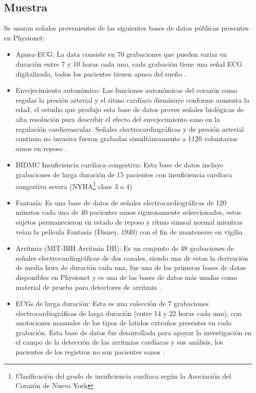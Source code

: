 \documentclass[12pt,letterpaper,oneside,openright]{book}
\begin{document}
\subsection{Muestra}
Se usaran señales provenientes de las siguientes bases de datos públicas presentes en Physionet: 
\begin{itemize}
	\item Apnea-ECG: La data consiste en 70 grabaciones que pueden variar en duración entre 7 y 10 horas cada uno, cada grabación tiene una señal ECG digitalizada, todos los pacientes tienen apnea del sueño \cite{apneaDB}. 
	\item Envejecimiento autonómico: Las funciones autonómicas del corazón como regular la presión arterial y el ritmo cardíaco disminuye conforme aumenta la edad, el estudio que produjo esta base de datos provee señales biológicas de alta resolución para describir el efecto del envejecimiento sano en la regulación cardiovascular. Señales electrocardiográficas y de presión arterial continua no invasiva fueron grabadas simultáneamente a 1120 voluntarios sanos en reposo \cite{autonomicAgingDB}.
	\item BIDMC Insuficiencia cardíaca congestiva: Esta base de datos incluye grabaciones de larga duración de 15 pacientes con insuficiencia cardíaca congestiva severa (NYHA\footnote{Clasificación del grado de insuficiencia cardíaca según la Asociación del Corazón de Nueva York} clase 3 o 4) \cite{InsuficienciaCardiacaDB}
	\item Fantasía: Es una base de datos de señales electrocardiográficas de 120 minutos cada una de 40 pacientes sanos rigurosamente seleccionados, estos sujetos permanecieron en estado de reposo y ritmo sinusal normal mientras veían la película Fantasía (Disney, 1940) con el fin de mantenerse en vigilia \cite{fantasiaDB}.
	\item Arritmia (MIT-BIH Arritmia DB): Es un conjunto de 48 grabaciones de señales electrocardiográficas de dos canales, siendo una de estas la derivación  de media hora de duración cada una, fue una de las primeras bases de datos disponibles en Physionet y es una de las bases de datos más usadas como material de prueba para detectores de arritmia \cite{arritmiadb}. 
	\item ECGs de larga duración: Esta es una colección de 7 grabaciones electrocardiográficas de larga duración (entre 14 y 22 horas cada uno), con anotaciones manuales de los tipos de latidos extraños presentes en cada grabación. Esta base de datos fue desarrollada para apoyar la investigación en el campo de la detección de las arritmias cardíacas y sus análisis, los pacientes de los registros no son pacientes sanos \cite{longtermdb}.

\end{itemize}
\end{document}

